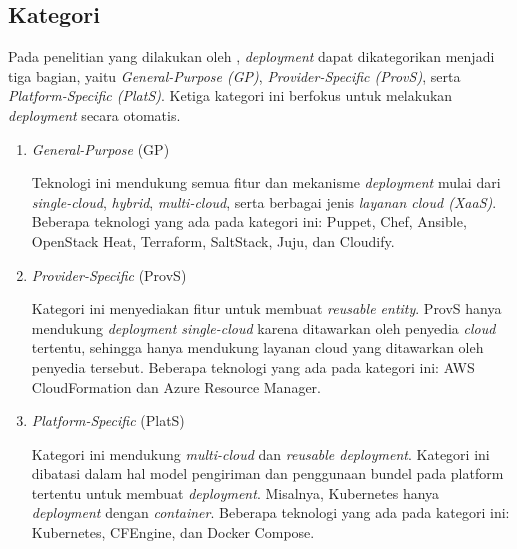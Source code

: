 \subsection{Kategori}
Pada penelitian yang dilakukan oleh \parencite{wurster2020essential}, \textit{deployment} dapat dikategorikan menjadi tiga bagian, yaitu \textit{General-Purpose (GP)}, \textit{Provider-Specific (ProvS)}, serta \textit{Platform-Specific (PlatS)}. Ketiga kategori ini berfokus untuk melakukan \textit{deployment} secara otomatis.

\begin{enumerate}
  \item \textit{General-Purpose} (GP)

        Teknologi ini mendukung semua fitur dan mekanisme \textit{deployment} mulai dari \textit{single-cloud}, \textit{hybrid}, \textit{multi-cloud}, serta berbagai jenis \textit{layanan cloud (XaaS)}. Beberapa teknologi yang ada pada kategori ini: Puppet, Chef, Ansible, OpenStack Heat, Terraform, SaltStack, Juju, dan Cloudify.

  \item \textit{Provider-Specific} (ProvS)

        Kategori ini menyediakan fitur untuk membuat \textit{reusable entity}. ProvS hanya mendukung \textit{deployment single-cloud} karena ditawarkan oleh penyedia \textit{cloud} tertentu, sehingga hanya mendukung layanan cloud yang ditawarkan oleh penyedia tersebut. Beberapa teknologi yang ada pada kategori ini: AWS CloudFormation dan Azure Resource Manager.

  \item \textit{Platform-Specific} (PlatS)

        Kategori ini mendukung \textit{multi-cloud} dan \textit{reusable deployment}. Kategori ini dibatasi dalam hal model pengiriman dan penggunaan bundel pada platform tertentu untuk membuat \textit{deployment}. Misalnya, Kubernetes hanya \textit{deployment} dengan \textit{container}. Beberapa teknologi yang ada pada kategori ini: Kubernetes, CFEngine, dan Docker Compose.

\end{enumerate}